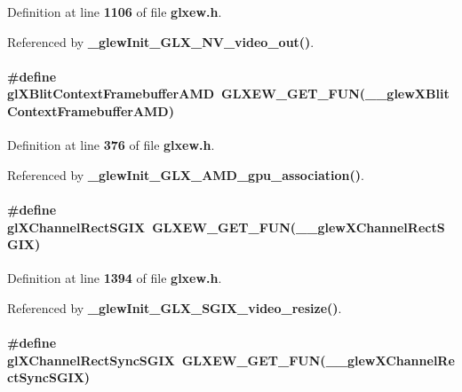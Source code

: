 Definition at line {\bf 1106} of file {\bf glxew.\+h}.



Referenced by {\bf \+\_\+glew\+Init\+\_\+\+G\+L\+X\+\_\+\+N\+V\+\_\+video\+\_\+out()}.

\paragraph[{gl\+X\+Blit\+Context\+Framebuffer\+A\+MD}]{\setlength{\rightskip}{0pt plus 5cm}\#define gl\+X\+Blit\+Context\+Framebuffer\+A\+MD~{\bf G\+L\+X\+E\+W\+\_\+\+G\+E\+T\+\_\+\+F\+UN}({\bf \+\_\+\+\_\+glew\+X\+Blit\+Context\+Framebuffer\+A\+MD})}\label{glxew_8h_a38af73faf23fe96dd0bac4f60d012fb8}


Definition at line {\bf 376} of file {\bf glxew.\+h}.



Referenced by {\bf \+\_\+glew\+Init\+\_\+\+G\+L\+X\+\_\+\+A\+M\+D\+\_\+gpu\+\_\+association()}.

\paragraph[{gl\+X\+Channel\+Rect\+S\+G\+IX}]{\setlength{\rightskip}{0pt plus 5cm}\#define gl\+X\+Channel\+Rect\+S\+G\+IX~{\bf G\+L\+X\+E\+W\+\_\+\+G\+E\+T\+\_\+\+F\+UN}({\bf \+\_\+\+\_\+glew\+X\+Channel\+Rect\+S\+G\+IX})}\label{glxew_8h_a5cb2badaaebe423eed1574e069c340bb}


Definition at line {\bf 1394} of file {\bf glxew.\+h}.



Referenced by {\bf \+\_\+glew\+Init\+\_\+\+G\+L\+X\+\_\+\+S\+G\+I\+X\+\_\+video\+\_\+resize()}.

\paragraph[{gl\+X\+Channel\+Rect\+Sync\+S\+G\+IX}]{\setlength{\rightskip}{0pt plus 5cm}\#define gl\+X\+Channel\+Rect\+Sync\+S\+G\+IX~{\bf G\+L\+X\+E\+W\+\_\+\+G\+E\+T\+\_\+\+F\+UN}({\bf \+\_\+\+\_\+glew\+X\+Channel\+Rect\+Sync\+S\+G\+IX})}\label{glxew_8h_a7871cce1f532178bb99cdeb599fa0338}


